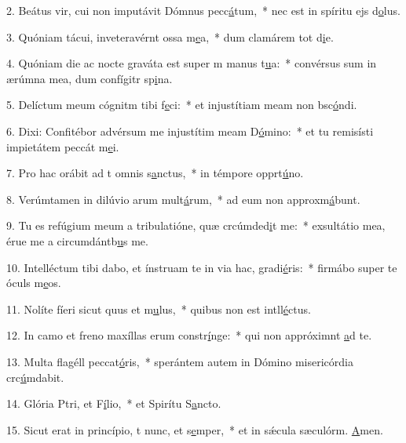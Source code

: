 2. Beátus vir, cui non imputávit Dómnus pecc\uline{á}tum,~* nec est in spíritu ejs d\uline{o}lus.\par 
3. Quóniam tácui, inveteravérnt ossa m\uline{e}a,~* dum clamárem tot d\uline{i}e.\par 
4. Quóniam die ac nocte graváta est super m manus t\uline{u}a:~* convérsus sum in ærúmna mea, dum confígitr sp\uline{i}na.\par 
5. Delíctum meum cógnitm tibi f\uline{e}ci:~* et injustítiam meam non bsc\uline{ó}ndi.\par 
6. Dixi: Confitébor advérsum me injustítim meam D\uline{ó}mino:~* et tu remisísti impietátem peccát m\uline{e}i.\par 
7. Pro hac orábit ad t omnis s\uline{a}nctus,~* in témpore opprt\uline{ú}no.\par 
8. Verúmtamen in dilúvio arum mult\uline{á}rum,~* ad eum non approxm\uline{á}bunt.\par 
9. Tu es refúgium meum a tribulatióne, quæ crcúmded\uline{i}t me:~* exsultátio mea, érue me a circumdántb\uline{u}s me.\par 
10. Intelléctum tibi dabo, et ínstruam te in via hac,  gradi\uline{é}ris:~* firmábo super te óculs m\uline{e}os.\par 
11. Nolíte fíeri sicut quus et m\uline{u}lus,~* quibus non est intll\uline{é}ctus.\par 
12. In camo et freno maxíllas erum constr\uline{í}nge:~* qui non appróximnt \uline{a}d te.\par 
13. Multa flagéll peccat\uline{ó}ris,~* sperántem autem in Dómino misericórdia crc\uline{ú}mdabit.\par 
14. Glória Ptri, et F\uline{í}lio,~* et Spirítu S\uline{a}ncto.\par 
15. Sicut erat in princípio, t nunc, et s\uline{e}mper,~* et in sǽcula sæculórm. \uline{A}men.\par 
